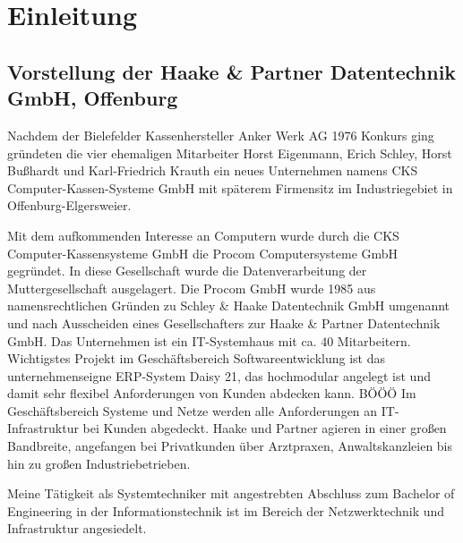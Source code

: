 \chapter{Einleitung}

\section{Vorstellung der Haake \& Partner Datentechnik GmbH, Offenburg}
Nachdem der Bielefelder Kassenhersteller Anker Werk AG 1976 Konkurs ging gründeten die vier ehemaligen Mitarbeiter Horst Eigenmann, Erich Schley, Horst Bußhardt und Karl-Friedrich Krauth ein neues Unternehmen namens CKS Computer-Kassen-Systeme GmbH mit späterem Firmensitz im Industriegebiet in Offenburg-Elgersweier. 

Mit dem aufkommenden Interesse an Computern wurde durch die CKS Computer-Kassensysteme GmbH die Procom Computersysteme GmbH gegründet. In diese Gesellschaft wurde die Datenverarbeitung der Muttergesellschaft ausgelagert. Die Procom GmbH wurde 1985 aus namensrechtlichen Gründen zu Schley \& Haake Datentechnik GmbH umgenannt und nach Ausscheiden eines Gesellschafters zur Haake \& Partner Datentechnik GmbH. Das Unternehmen ist ein IT-Systemhaus mit ca. 40 Mitarbeitern. Wichtigstes Projekt im Geschäftsbereich Softwareentwicklung ist das unternehmenseigne ERP-System Daisy 21, das hochmodular angelegt ist und damit sehr flexibel Anforderungen von Kunden abdecken kann. BÖÖÖ
Im Geschäftsbereich Systeme und Netze werden alle Anforderungen an IT-Infrastruktur bei Kunden abgedeckt. 
Haake und Partner agieren in einer großen Bandbreite, angefangen bei Privatkunden über Arztpraxen, Anwaltskanzleien bis hin zu großen Industriebetrieben.

  Meine Tätigkeit als Systemtechniker mit angestrebten Abschluss zum Bachelor of Engineering in der Informationstechnik ist im Bereich der Netzwerktechnik und Infrastruktur angesiedelt.